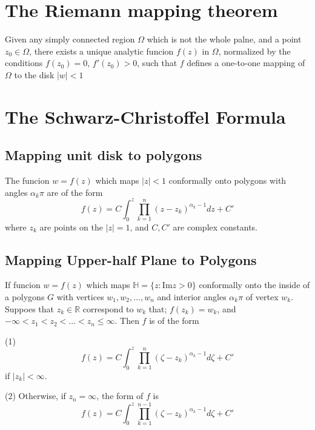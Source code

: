 \documentclass[12pt, oneside]{book}
\begin{document}
\section{The Riemann mapping theorem}
\begin{theorem}
    Given any simply connected region $\Omega$ which is not the whole palne, and a point $z_0 \in \Omega$, there exists a unique analytic funcion $f(z)$ in $\Omega$, normalized by the conditions $f(z_0)=0$, $f'(z_0) >0$, such that $f$ defines  a one-to-one mapping of $\Omega$ to the disk $\left|w\right| <1$
\end{theorem}


\section{The Schwarz-Christoffel Formula}

\subsection{Mapping unit disk to polygons}
\begin{theorem}
    The funcion $w=f(z)$ which maps $\left|z\right| < 1$ conformally onto polygons with angles $\alpha_k\pi$ are of the form
    \[
        f(z)
        =
        C\int_0^z \prod_{k=1}^n \left(z-z_k\right)^{\alpha_k -1} dz
        +C'
    \]
    where $z_k$ are points on the $\left|z\right| =1$, and $C,C'$ are complex constants.
\end{theorem}

\subsection{Mapping Upper-half Plane to Polygons}

\begin{theorem}
    If funcion $w=f(z)$ which maps $\mathbb{H}=\{z: \mathrm{Im}z >0\}$ conformally onto the inside of a polygons $G$ with vertices $w_1,w_2,\ldots,w_n$ and interior angles $\alpha_k\pi$ of vertex $w_k$.
    Suppoes that
    $z_k \in \mathbb{R}$
    correspond to $w_k$ that; $f(z_k) =w_k$, and $ -\infty<z_1 < z_2  < \ldots <z_n \leq \infty$.
    Then $f$ is of the form

    (1)
    \begin{equation*}
        f(z)
        =
        C\int_0^z \prod_{k=1}^n \left(\zeta-z_k\right)^{\alpha_k -1} d\zeta
        +C'
    \end{equation*}
    if $\left|z_k\right| < \infty $.

    (2) Otherwise, if $z_n=\infty$, the form of $f$ is
    \begin{equation*}
        f(z)
        =
        C\int_0^z \prod_{k=1}^{n-1} \left(\zeta-z_k\right)^{\alpha_k -1} d\zeta
        +C'
    \end{equation*}
\end{theorem}
\end{document}
